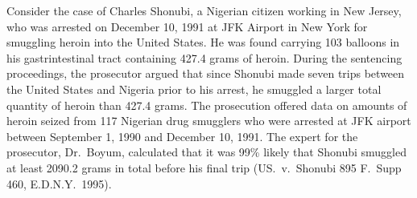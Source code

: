 \documentclass{article}
\begin{document}
Consider the case of Charles Shonubi, a Nigerian citizen working in New Jersey, who was arrested on December 10, 1991 at JFK Airport in New York for smuggling heroin into the United States. He was found carrying 103 balloons in his gastrintestinal tract containing 427.4 grams of heroin. 
 During the sentencing proceedings, the prosecutor argued that since Shonubi made seven trips between the United States and Nigeria prior to his arrest, he smuggled a larger total quantity of heroin than 427.4 grams. 
The prosecution offered data on amounts of heroin seized from 117 Nigerian drug smugglers %
who were arrested at JFK airport  between September 1, 1990 and December 10, 1991. 
The expert for the prosecutor, Dr.\ Boyum, calculated that it was 99\% likely that Shonubi smuggled at least 2090.2 grams in total before his final trip %
(US.\ v.\ Shonubi 895 F.\ Supp 460, E.D.N.Y.\ 1995).
%
\end{document}
